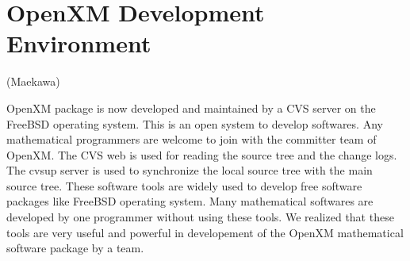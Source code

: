 
\section{OpenXM Development Environment}  (Maekawa)

OpenXM package is now developed and maintained by
a CVS server on the FreeBSD operating system.
This is an open system to develop softwares.
Any mathematical programmers are welcome to
join with the committer team of OpenXM.
The CVS web is used for reading the source tree and the change logs.
The cvsup server is used to synchronize the local source tree with
the main source tree.
These software tools are widely used to develop free software packages
like FreeBSD operating system.
Many mathematical softwares are developed by one programmer
without using these tools.
We realized that these tools are very useful and powerful in developement
of the OpenXM mathematical software package by a team.
